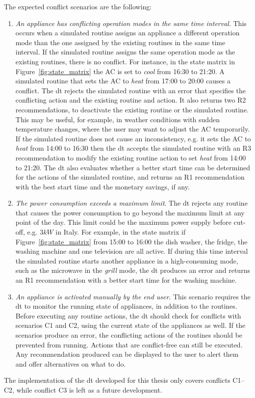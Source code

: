 The expected conflict scenarios are the following:
\begin{enumerate}[label={C\arabic*.}, leftmargin=3.5em]
    \item \textit{An appliance has conflicting operation modes in the same time interval}. This occurs when a simulated routine assigns an appliance a different operation mode than the one assigned by the existing routines in the same time interval. If the simulated routine assigns the same operation mode as the existing routines, there is no conflict. For instance, in the state matrix in Figure~\ref{fig:state_matrix} the AC is set to \textit{cool} from 16:30 to 21:20. A simulated routine that sets the AC to \textit{heat} from 17:00 to 20:00 causes a conflict. The \acrshort{dt} rejects the simulated routine with an error that specifies the conflicting action and the existing routine and action. It also returns two R2 recommendations, to  deactivate the existing routine or the simulated routine. This may be useful, for example, in weather conditions with sudden temperature changes, where the user may want to adjust the AC temporarily. If the simulated routine does not cause an inconsistency, e.g. it sets the AC to \textit{heat} from 14:00 to 16:30 then the \acrshort{dt} accepts the simulated routine with an R3 recommendation to modify the existing routine action to set \textit{heat} from 14:00 to 21:20. The \acrshort{dt} also evaluates whether a better start time can be determined for the actions of the simulated routine, and returns an R1 recommendation with the best start time and the monetary savings, if any.

    \item \textit{The power consumption exceeds a maximum limit}. The \acrshort{dt} rejects any routine that causes the power consumption to go beyond the maximum limit at any point of the day. This limit could be the maximum power supply before cut-off, e.g. $3kW$ in Italy. For example, in the state matrix if Figure~\ref{fig:state_matrix} from 15:00 to 16:00 the dish washer, the fridge, the washing machine and one television are all active. If during this time interval the simulated routine starts another appliance in a high-consuming mode, such as the microwave in the \textit{grill} mode, the \acrshort{dt} produces an error and returns an R1 recommendation with a better start time for the washing machine.

    \item \textit{An appliance is activated manually by the end user}. This scenario requires the \acrshort{dt} to monitor the running state of appliances, in addition to the routines. Before executing any routine actions, the \acrshort{dt} should check for conflicts with scenarios C1 and C2, using the current state of the appliances as well. If the scenarios produce an error, the conflicting actions of the routines should be prevented from running. Actions that are conflict-free can still be executed. Any recommendation produced can be displayed to the user to alert them and offer alternatives on what to do.
\end{enumerate}
The implementation of the \acrshort{dt} developed for this thesis only covers conflicts C1--C2, while conflict C3 is left as a future development.

